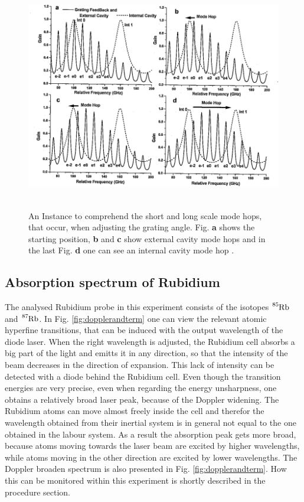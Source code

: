 \begin{figure}
  \centering
  \includegraphics[height=10cm]{Ordnername/continter}
  \caption{An Instance to comprehend the short and long scale mode hops, that occur, when adjusting the grating angle.
  Fig. \textbf{a} shows the starting position, \textbf{b} and \textbf{c} show external cavity mode hops and in the
  last Fig. \textbf{d} one can see an internal cavity mode hop \cite{manual}.}
  \label{fig:continter}
\end{figure}

\subsection{Absorption spectrum of Rubidium}

The analysed Rubidium probe in this experiment consists of the isotopes $\ce{^{85}Rb}$ and $\ce{^{87}Rb}$.
In Fig. \ref{fig:dopplerandterm} one can view the relevant atomic hyperfine transitions, that can be induced
with the output wavelength of the diode laser. When the right wavelength is adjusted, the Rubidium cell
absorbs a big part of the light and emitts it in any direction, so that the intensity of the beam decreases
in the direction of expansion. This lack of intensity can be detected with a diode behind the Rubidium cell.
Even though the transition energies are very precise, even when regarding the energy unsharpness,
one obtains a relatively broad laser peak, because of the Doppler widening.
The Rubidium atoms can move almost freely inside the cell and therefor the wavelength obtained from their inertial system
is in general not equal to the one obtained in the labour system. As a result the absorption peak gets more broad, because atoms
moving towards the laser beam are excited by higher wavelengths, while atoms moving in the other direction are excited
by lower wavelengths. The Doppler broaden spectrum is also presented in Fig. \ref{fig:dopplerandterm}. How this can
be monitored within this experiment is shortly described in the procedure section.

